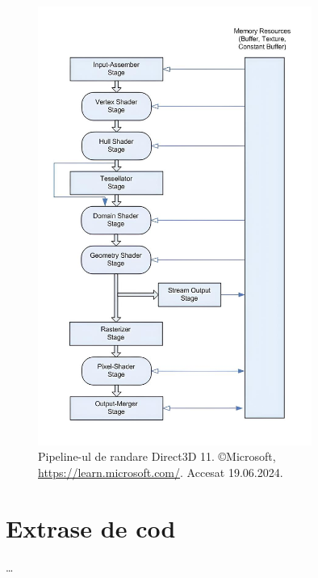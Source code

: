 \documentclass[12pt,a4paper]{report}
\numberwithin{equation}{section} %
\begin{document}
\begin{appendices}
	\begin{figure}
		\centering
		\includegraphics[width=0.8\textwidth]{pics/pipeline.jpg}
		\caption{Pipeline-ul de randare Direct3D 11. \copyright Microsoft, \url{https://learn.microsoft.com/}. Accesat 19.06.2024.}
		\label{fig:pipeline}
	\end{figure}

	\chapter{Extrase de cod} %
	\ldots


\end{appendices}
\end{document}
